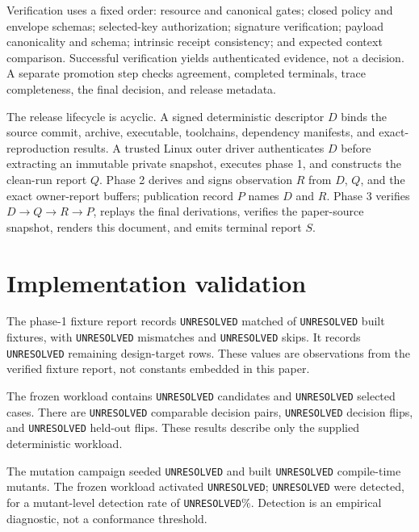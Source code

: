 \documentclass[10pt]{article}
\providecommand{\ArtifactFixtureBuiltExpected}{UNRESOLVED}
\providecommand{\ArtifactFixtureBuiltMatched}{UNRESOLVED}
\providecommand{\ArtifactFixtureBuiltMismatched}{UNRESOLVED}
\providecommand{\ArtifactFixtureBuiltSkipped}{UNRESOLVED}
\providecommand{\ArtifactFixtureDesignTargets}{UNRESOLVED}
\providecommand{\ArtifactWorkloadCandidates}{UNRESOLVED}
\providecommand{\ArtifactWorkloadSelected}{UNRESOLVED}
\providecommand{\ArtifactWorkloadDecisionPairs}{UNRESOLVED}
\providecommand{\ArtifactWorkloadDecisionFlips}{UNRESOLVED}
\providecommand{\ArtifactWorkloadHeldOutFlips}{UNRESOLVED}
\providecommand{\ArtifactMutationSeeded}{UNRESOLVED}
\providecommand{\ArtifactMutationBuilt}{UNRESOLVED}
\providecommand{\ArtifactMutationActivated}{UNRESOLVED}
\providecommand{\ArtifactMutationDetected}{UNRESOLVED}
\providecommand{\ArtifactMutationRate}{UNRESOLVED}
\newcommand{\artifactvalue}[1]{\texttt{\small #1}}
\begin{document}
Verification uses a fixed order: resource and canonical gates; closed policy
and envelope schemas; selected-key authorization; signature verification;
payload canonicality and schema; intrinsic receipt consistency; and expected
context comparison.  Successful verification yields authenticated evidence,
not a decision.  A separate promotion step checks agreement, completed
terminals, trace completeness, the final decision, and release metadata.

The release lifecycle is acyclic.  A signed deterministic descriptor $D$
binds the source commit, archive, executable, toolchains, dependency manifests,
and exact-reproduction results.  A trusted Linux outer driver authenticates
$D$ before extracting an immutable private snapshot, executes phase 1, and
constructs the clean-run report $Q$.  Phase 2 derives and signs observation
$R$ from $D$, $Q$, and the exact owner-report buffers; publication record $P$
names $D$ and $R$.  Phase 3 verifies $D\rightarrow Q\rightarrow R\rightarrow P$,
replays the final derivations, verifies the paper-source snapshot, renders this
document, and emits terminal report $S$.

\section{Implementation validation}

The phase-1 fixture report records
\artifactvalue{\ArtifactFixtureBuiltMatched} matched of
\artifactvalue{\ArtifactFixtureBuiltExpected} built fixtures, with
\artifactvalue{\ArtifactFixtureBuiltMismatched} mismatches and
\artifactvalue{\ArtifactFixtureBuiltSkipped} skips.  It records
\artifactvalue{\ArtifactFixtureDesignTargets} remaining design-target rows.
These values are observations from the verified fixture report, not constants
embedded in this paper.

The frozen workload contains \artifactvalue{\ArtifactWorkloadCandidates}
candidates and \artifactvalue{\ArtifactWorkloadSelected} selected cases.
There are \artifactvalue{\ArtifactWorkloadDecisionPairs} comparable decision
pairs, \artifactvalue{\ArtifactWorkloadDecisionFlips} decision flips, and
\artifactvalue{\ArtifactWorkloadHeldOutFlips} held-out flips.  These results
describe only the supplied deterministic workload.

The mutation campaign seeded \artifactvalue{\ArtifactMutationSeeded} and built
\artifactvalue{\ArtifactMutationBuilt} compile-time mutants.  The frozen
workload activated \artifactvalue{\ArtifactMutationActivated};
\artifactvalue{\ArtifactMutationDetected} were detected, for a mutant-level
detection rate of \artifactvalue{\ArtifactMutationRate}\%.  Detection is an
empirical diagnostic, not a conformance threshold.
\end{document}
